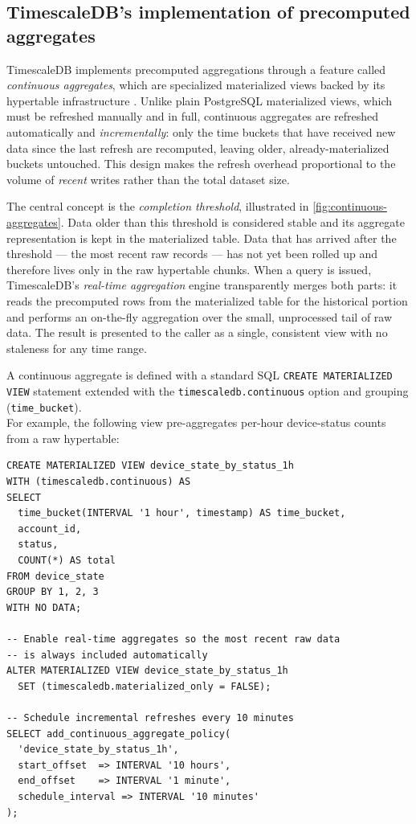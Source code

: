 \subsection{TimescaleDB's implementation of precomputed aggregates}

TimescaleDB implements precomputed aggregations through a feature called
\textit{continuous aggregates}, which are specialized materialized views backed
by its hypertable infrastructure \cite{TimescaleDB:09}. Unlike plain PostgreSQL
materialized views, which must be refreshed manually and in full, continuous
aggregates are refreshed automatically and \textit{incrementally}: only the
time buckets that have received new data since the last refresh are recomputed,
leaving older, already-materialized buckets untouched. This design makes the
refresh overhead proportional to the volume of \emph{recent} writes rather than
the total dataset size.\cite{TimescaleDB:05}

The central concept is the \textit{completion threshold}, illustrated in
\autoref{fig:continuous-aggregates}. Data older than this threshold is
considered stable and its aggregate representation is kept in the materialized
table. Data that has arrived after the threshold --- the most recent raw
records --- has not yet been rolled up and therefore lives only in the raw
hypertable chunks. When a query is issued, TimescaleDB's \textit{real-time
  aggregation} engine transparently merges both parts: it reads the precomputed
rows from the materialized table for the historical portion and performs an
on-the-fly aggregation over the small, unprocessed tail of raw data. The result
is presented to the caller as a single, consistent view with no staleness for
any time range.\cite{TimescaleDB:05}



A continuous aggregate is defined with a standard SQL \texttt{CREATE
  MATERIALIZED VIEW} statement extended with the \texttt{timescaledb.continuous}
option and grouping (\texttt{time\_bucket}).\\\cite{TimescaleDB:06} For example,
the following view pre-aggregates per-hour device-status counts from a raw
hypertable:

\begin{lstlisting}[language=PGTSSQL, caption=Defining a continuous aggregate in TimescaleDB]
CREATE MATERIALIZED VIEW device_state_by_status_1h
WITH (timescaledb.continuous) AS
SELECT
  time_bucket(INTERVAL '1 hour', timestamp) AS time_bucket,
  account_id,
  status,
  COUNT(*) AS total
FROM device_state
GROUP BY 1, 2, 3
WITH NO DATA;

-- Enable real-time aggregates so the most recent raw data
-- is always included automatically
ALTER MATERIALIZED VIEW device_state_by_status_1h
  SET (timescaledb.materialized_only = FALSE);

-- Schedule incremental refreshes every 10 minutes
SELECT add_continuous_aggregate_policy(
  'device_state_by_status_1h',
  start_offset  => INTERVAL '10 hours',
  end_offset    => INTERVAL '1 minute',
  schedule_interval => INTERVAL '10 minutes'
);
\end{lstlisting}

